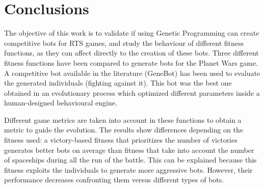 \documentclass[preprint]{elsarticle}
\begin{document}
\section{Conclusions}
\label{sec:conclusion}


The objective of this work is to validate if using Genetic Programming
can create competitive bots for RTS games, %
 and study the behaviour of
different fitness functions, as they can affect directly to the
creation of these bots. Three different fitness functions have been
compared to generate bots for the Planet Wars game. A competitive bot
available in the literature (GeneBot) has been used to evaluate the
generated individuals (fighting against it). %
 This bot was the best one
obtained in an evolutionary process which optimized different
parameters inside a human-designed behavioural engine.  


Different game metrics are taken into account in these functions to
obtain a metric to guide the evolution. %
The results show differences depending on the fitness used: %
 a victory-based fitness that prioritizes the number of victories
 generates better bots on average than fitness that take into account
 the number of spaceships during all the run of the battle. %
This can
 be explained because this fitness exploits the individuals to
 generate more aggressive bots. However, their performance decreases
 confronting them versus different types of bots.  %
\end{document}
